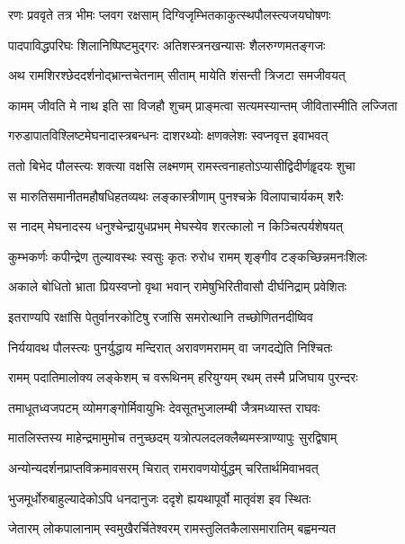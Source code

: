\twolineshloka
{रणः प्रववृते तत्र भीमः प्लवग रक्षसाम्}
{दिग्विजृम्भितकाकुत्स्थपौलस्त्यजयघोषणः} %

\twolineshloka
{पादपाविद्धपरिघः शिलानिष्पिष्टमुद्गरः}
{अतिशस्त्रनखन्यासः शैलरुग्णमतङ्गजः} %

\twolineshloka
{अथ रामशिरश्छेददर्शनोद्भ्रान्तचेतनाम्}
{सीताम् मायेति शंसन्ती त्रिजटा समजीवयत्} %

\twolineshloka
{कामम् जीवति मे नाथ इति सा विजहौ शुचम्}
{प्राङ्मत्वा सत्यमस्यान्तम् जीवितास्मीति लज्जिता} %

\twolineshloka
{गरुडापातविश्लिष्टमेघनादास्त्रबन्धनः}
{दाशरथ्योः क्षणक्लेशः स्वप्नवृत्त इवाभवत्} %

\twolineshloka
{ततो बिभेद पौलस्त्यः शक्त्या वक्षसि लक्ष्मणम्}
{रामस्त्वनाहतोऽप्यासीद्विदीर्णहॄदयः शुचा} %

\twolineshloka
{स मारुतिसमानीतमहौषधिहतव्यथः}
{लङ्कास्त्रीणाम् पुनश्चक्रे विलापाचार्यकम् शरैः} %

\twolineshloka
{स नादम् मेघनादस्य धनुश्चेन्द्रायुधप्रभम्}
{मेघस्येव शरत्कालो न किञ्चित्पर्यशेषयत्} %

\twolineshloka
{कुम्भकर्णः कपीन्द्रेण तुल्यावस्थः स्वसुः कृतः}
{रुरोध रामम् शृङ्गीव टङ्कच्छिन्नमनःशिलः} %

\twolineshloka
{अकाले बोधितो भ्राता प्रियस्वप्नो वृथा भवान्}
{रामेषुभिरितीवासौ दीर्घनिद्राम् प्रवेशितः} %

\twolineshloka
{इतराण्यपि रक्षांसि पेतुर्वानरकोटिषु}
{रजांसि समरोत्थानि तच्छोणितनदीष्विव} %

\twolineshloka
{निर्ययावथ पौलस्त्यः पुनर्युद्धाय मन्दिरात्}
{अरावणमरामम् वा जगदद्येति निश्चितः} %

\twolineshloka
{रामम् पदातिमालोक्य लङ्केशम् च वरूथिनम्}
{हरियुग्यम् रथम् तस्मै प्रजिघाय पुरन्दरः} %

\twolineshloka
{तमाधूतध्वजपटम् व्योमगङ्गोर्मिवायुभिः}
{देवसूतभुजालम्बी जैत्रमध्यास्त राघवः} %

\twolineshloka
{मातलिस्तस्य माहेन्द्रमामुमोच तनुच्छदम्}
{यत्रोत्पलदलक्लैब्यमस्त्राण्यापुः सुरद्विषाम्} %

\twolineshloka
{अन्योन्यदर्शनप्राप्तविक्रमावसरम् चिरात्}
{रामरावणयोर्युद्धम् चरितार्थमिवाभवत्} %

\twolineshloka
{भुजमूर्धोरुबाहुल्यादेकोऽपि धनदानुजः}
{ददृशे ह्ययथापूर्वो मातृवंश इव स्थितः} %

\twolineshloka
{जेतारम् लोकपालानाम् स्वमुखैरर्चितेश्वरम्}
{रामस्तुलितकैलासमारातिम् बह्वमन्यत} %

